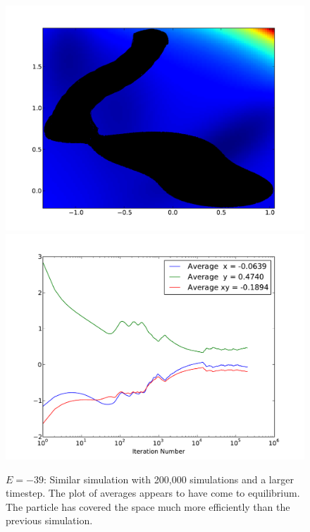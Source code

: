 \documentclass[letterpaper]{article}
\begin{document}
\begin{figure}[p]
\begin{center}
\includegraphics[width=5in]{t5.pdf}
\includegraphics[width=5in]{t5a.pdf}
\end{center}
\caption{$E=-39$: Similar simulation with 200,000 simulations and a larger
timestep. The plot of averages appears to have come to equilibrium. The particle
has covered the space much more efficiently than the previous simulation.}
\label{fig:t5}
\end{figure}
\end{document}

